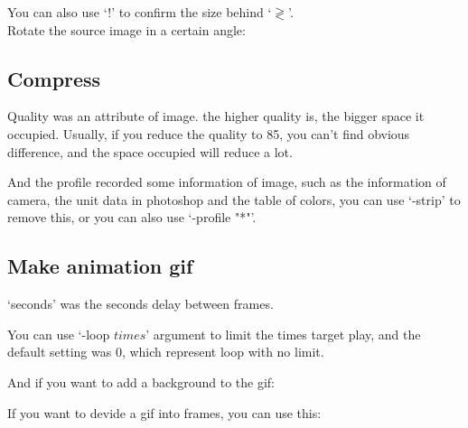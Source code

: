 \documentclass[12pt]{article}
\begin{document}
You can also use `!' to confirm the size behind `$\gtrless$'.\\

Rotate the source image in a certain angle:\vspace{5mm}

{\centering{}\par}

\subsection{Compress}
{\centering{}\par}\vspace{5mm}

Quality was an attribute of image. the higher quality is, the bigger space it occupied. Usually, if you reduce the quality to 85, you can't find obvious difference, and the space occupied will reduce a lot.

And the profile recorded some information of image, such as the information of camera, the unit data in photoshop and the table of colors, you can use `-strip' to remove this, or you can also use `-profile "*"'.

\subsection{Make animation gif}
{\centering{}\par}\vspace{5mm}

`seconds' was the seconds delay between frames.

You can use `-loop $times$' argument to limit the times target play, and the default setting was 0, which represent loop with no limit.

And if you want to add a background to the gif:\vspace{5mm}

{\centering{}\par} \vspace{5mm}

If you want to devide a gif into frames, you can use this:\vspace{5mm}

{\centering{}\par}\vspace{5mm}
\end{document}
